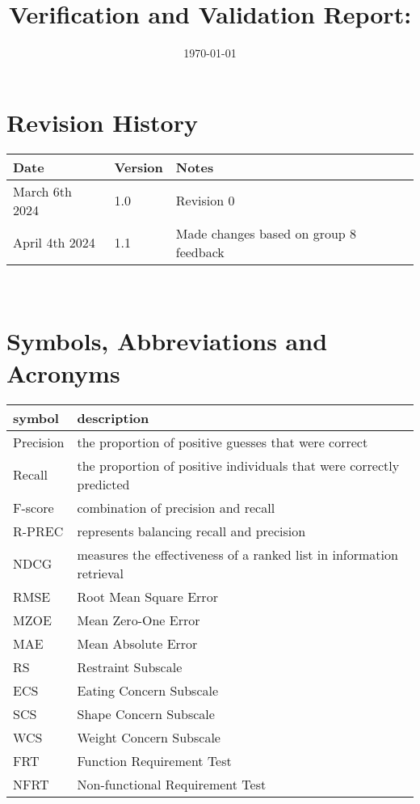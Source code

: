\documentclass[12pt, titlepage]{article}
\begin{document}
\title{Verification and Validation Report: \progname}
\author{\authname}
\date{\today}
 \maketitle




\section{Revision History}


\begin{tabularx}{\textwidth}{p{3cm}p{2cm}X}
\toprule {\bf Date} & {\bf Version} & {\bf Notes}\\
\midrule
March 6th 2024 & 1.0 & Revision 0\\
April 4th 2024 & 1.1 & Made changes based on group 8 feedback\\
\bottomrule
\end{tabularx}


~\newpage


\section{Symbols, Abbreviations and Acronyms}


\renewcommand{\arraystretch}{1.2}
\begin{tabular}{l l}
 \toprule   
 \textbf{symbol} & \textbf{description}\\
 \midrule
 Precision & the proportion of positive guesses that were correct\\
 Recall & the proportion of positive individuals that were correctly predicted\\
 F-score & combination of precision and recall\\
 R-PREC & represents balancing recall and precision\\
 NDCG & measures the effectiveness of a ranked list in information retrieval\\
 RMSE & Root Mean Square Error\\
 MZOE & Mean Zero-One Error\\
 MAE & Mean Absolute Error\\
 RS & Restraint Subscale\\
 ECS & Eating Concern Subscale\\
 SCS & Shape Concern Subscale\\
 WCS & Weight Concern Subscale\\
 FRT & Function Requirement Test\\
 NFRT & Non-functional Requirement Test\\


 \bottomrule
\end{tabular}\\
\end{document}
